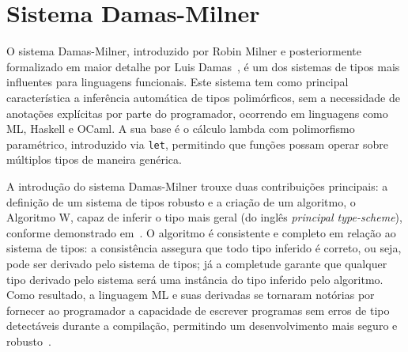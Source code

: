 \newcommand{\defas}{\ensuremath{\overset{def}{=}}}
\newcommand{\fv}{\ensuremath{\text{FV}}}
\newcommand{\fvc}{\ensuremath{\text{FVC}}}
\newcommand{\eeq}{\ensuremath{\overset{e}{=}}}
\newcommand{\Append}{\ensuremath{\texttt{++}}}
\newcommand{\If}{\ensuremath{\text{se}}}
\newcommand{\Let}{\ensuremath{\text{let}}}
\newcommand{\In}{\ensuremath{\text{in}}}
\newcommand{\Then}{\ensuremath{\text{então}}}
\newcommand{\Return}{\ensuremath{\text{retorna}}}
\newcommand{\Else}{\ensuremath{\text{senão}}}
\newcommand{\Elseif}{\ensuremath{\text{senão se}}}
\newcommand{\Fail}{\ensuremath{\text{falha}}}
\newcommand{\Unify}{\ensuremath{\textit{unify}}}
\newcommand{\Occurs}{\ensuremath{\textit{occurs}}}
\newcommand{\True}{\ensuremath{\texttt{Verdadeiro}}}
\newcommand{\False}{\ensuremath{\texttt{Falso}}}
\newcommand{\Whitespace}{\ensuremath{\texttt{ }}}
\newcommand{\TODO}[1]{\textcolor{red}{\textbf{TODO:} #1}}

\section{Sistema Damas-Milner}\label{sec:damas-milner}

O sistema Damas-Milner, introduzido por Robin Milner e posteriormente formalizado em maior detalhe por Luis Damas~\cite{milner1978polymorphism,damas1982principal}, é um dos sistemas de tipos mais influentes para linguagens funcionais.
Este sistema tem como principal característica a inferência automática de tipos polimórficos, sem a necessidade de anotações explícitas por parte do programador, ocorrendo em linguagens como ML, Haskell e OCaml.
A sua base é o cálculo lambda com polimorfismo paramétrico, introduzido via \texttt{let}, permitindo que funções possam operar sobre múltiplos tipos de maneira genérica.

A introdução do sistema Damas-Milner trouxe duas contribuições principais: a definição de um sistema de tipos robusto e a criação de um algoritmo, o Algoritmo W, capaz de inferir o tipo mais geral (do inglês \textit{principal type-scheme}), conforme demonstrado em~.
O algoritmo é consistente e completo em relação ao sistema de tipos: a consistência assegura que todo tipo inferido é correto, ou seja, pode ser derivado pelo sistema de tipos; já a completude garante que qualquer tipo derivado pelo sistema será uma instância do tipo inferido pelo algoritmo.
Como resultado, a linguagem ML e suas derivadas se tornaram notórias por fornecer ao programador a capacidade de escrever programas sem erros de tipo detectáveis durante a compilação, permitindo um desenvolvimento mais seguro e robusto~\cite{milner1978polymorphism, damas1984assignment}.

